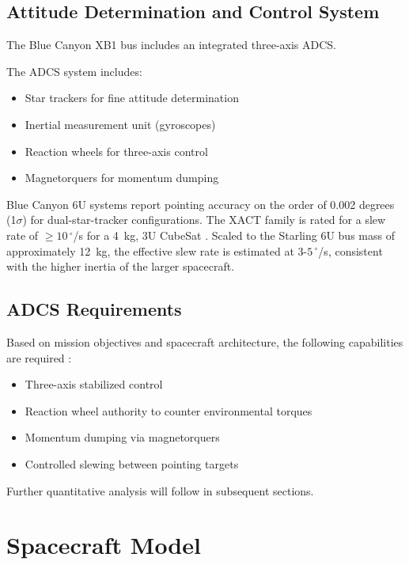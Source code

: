 \documentclass[12pt]{article}
\begin{document}
\subsection{Attitude Determination and Control System}

The Blue Canyon XB1 bus includes an integrated three-axis ADCS.

The ADCS system includes:

\begin{itemize}
    \item Star trackers for fine attitude determination
    \item Inertial measurement unit (gyroscopes)
    \item Reaction wheels for three-axis control
    \item Magnetorquers for momentum dumping
\end{itemize}

Blue Canyon 6U systems report pointing accuracy on the order of 0.002 degrees (1$\sigma$) for dual-star-tracker configurations.
The XACT family is rated for a slew rate of $\geq 10\,^\circ$/s for a 4~kg, 3U CubeSat
\cite{BCT_XACT}. Scaled to the Starling 6U bus mass of approximately 12~kg, the effective
slew rate is estimated at $3$-\-$5\,^\circ$/s, consistent with the higher inertia of the
larger spacecraft.

\subsection{ADCS Requirements}

Based on mission objectives and spacecraft architecture, the following capabilities are required \cite{SMAD}:

\begin{itemize}
    \item Three-axis stabilized control
    \item Reaction wheel authority to counter environmental torques
    \item Momentum dumping via magnetorquers
    \item Controlled slewing between pointing targets
\end{itemize}

Further quantitative analysis will follow in subsequent sections.


\section{Spacecraft Model}
\label{sec:model}
\end{document}
